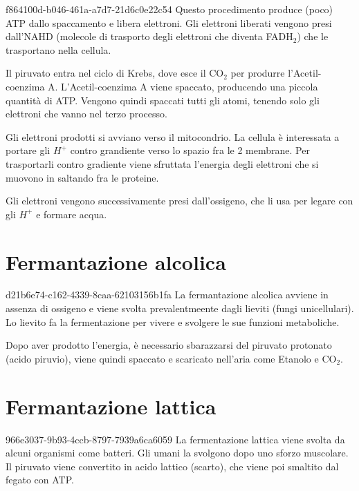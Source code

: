 \documentclass[preview]{standalone}
\begin{document}
\begin{snippet}{f864100d-b046-461a-a7d7-21d6c0e22c54}
    Questo procedimento produce (poco) ATP dallo spaccamento e libera elettroni.
    Gli elettroni liberati vengono presi dall'NAHD (molecole di trasporto degli elettroni
    che diventa FADH\({}_2\))
    che le trasportano nella cellula.

    Il piruvato entra nel ciclo di Krebs, dove esce il CO\({}_2\) per produrre l'Acetil-coenzima A.
    L'Acetil-coenzima A viene spaccato, producendo una piccola quantità di ATP.
    Vengono quindi spaccati tutti gli atomi, tenendo solo gli elettroni che vanno nel terzo processo.

    Gli elettroni prodotti si avviano verso il mitocondrio. La cellula è interessata a portare
    gli \(H^+\) contro grandiente verso lo spazio fra le 2 membrane.
    Per trasportarli contro gradiente viene sfruttata l'energia degli elettroni che si muovono in saltando fra le proteine.

    Gli elettroni vengono successivamente presi dall'ossigeno, che li usa per legare con gli \(H^+\) e formare
    acqua.
\end{snippet}

\section{Fermantazione alcolica}

\begin{snippet}{d21b6e74-c162-4339-8caa-62103156b1fa}
    La fermantazione alcolica avviene in assenza di ossigeno e viene svolta prevalentmeente dagli lieviti (fungi unicellulari).
    Lo lievito fa la fermentazione per vivere e svolgere le sue funzioni metaboliche.
    
    Dopo aver prodotto l'energia, è necessario sbarazzarsi del piruvato protonato (acido piruvio),
    viene quindi spaccato e scaricato nell'aria come Etanolo e CO\({}_2\).
\end{snippet}

\section{Fermantazione lattica}

\begin{snippet}{966e3037-9b93-4ccb-8797-7939a6ca6059}
    La fermentazione lattica viene svolta da alcuni organismi come batteri.
    Gli umani la svolgono dopo uno sforzo muscolare.
    Il piruvato viene convertito in acido lattico (scarto), che viene poi smaltito dal fegato con ATP.
\end{snippet}
\end{document}
